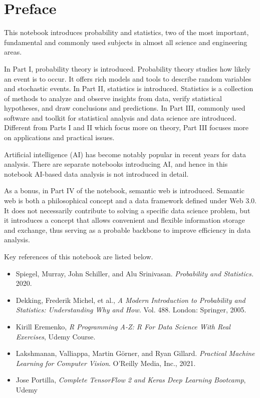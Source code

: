 \chapter*{Preface}

This notebook introduces probability and statistics, two of the most important, fundamental and commonly used subjects in almost all science and engineering areas.

In Part I, probability theory is introduced. Probability theory studies how likely an event is to occur. It offers rich models and tools to describe random variables and stochastic events. In Part II, statistics is introduced. Statistics is a collection of methods to analyze and observe insights from data, verify statistical hypotheses, and draw conclusions and predictions. In Part III, commonly used software and toolkit for statistical analysis and data science are introduced. Different from Parts I and II which focus more on theory, Part III focuses more on applications and practical issues.

Artificial intelligence (AI) has become notably popular in recent years for data analysis. There are separate notebooks introducing AI, and hence in this notebook AI-based data analysis is not introduced in detail.

As a bonus, in Part IV of the notebook, semantic web is introduced. Semantic web is both a philosophical concept and a data framework defined under Web 3.0. It does not necessarily contribute to solving a specific data science problem, but it introduces a concept that allows convenient and flexible information storage and exchange, thus serving as a probable backbone to improve efficiency in data analysis.

Key references of this notebook are listed below.

\begin{itemize}
  \item Spiegel, Murray, John Schiller, and Alu Srinivasan. \textit{Probability and Statistics.} 2020.
  \item Dekking, Frederik Michel, et al., \textit{A Modern Introduction to Probability and Statistics: Understanding Why and How.} Vol. 488. London: Springer, 2005.
  \item Kirill Eremenko, \textit{R Programming A-Z: R For Data Science With Real Exercises}, Udemy Course.
  \item Lakshmanan, Valliappa, Martin Görner, and Ryan Gillard. \textit{Practical Machine Learning for Computer Vision}. O'Reilly Media, Inc., 2021.
  \item Jose Portilla, \textit{Complete TensorFlow 2 and Keras Deep Learning Bootcamp}, Udemy
\end{itemize}

